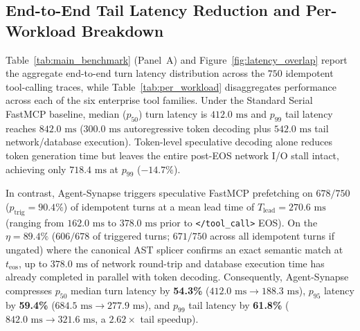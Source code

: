 \documentclass[10pt,conference]{IEEEtran}
\begin{document}
\subsection{End-to-End Tail Latency Reduction and Per-Workload Breakdown}
Table~\ref{tab:main_benchmark} (Panel~A) and Figure~\ref{fig:latency_overlap} report the aggregate end-to-end turn latency distribution across the $750$ idempotent tool-calling traces, while Table~\ref{tab:per_workload} disaggregates performance across each of the six enterprise tool families. Under the Standard Serial FastMCP baseline, median ($p_{50}$) turn latency is $412.0\text{ ms}$ and $p_{99}$ tail latency reaches $842.0\text{ ms}$ ($300.0\text{ ms}$ autoregressive token decoding plus $542.0\text{ ms}$ tail network/database execution). Token-level speculative decoding alone reduces token generation time but leaves the entire post-EOS network I/O stall intact, achieving only $718.4\text{ ms}$ at $p_{99}$ ($-14.7\%$).

In contrast, Agent-Synapse triggers speculative FastMCP prefetching on $678 / 750$ ($p_{\text{trig}} = 90.4\%$) of idempotent turns at a mean lead time of $T_{\text{lead}} = 270.6\text{ ms}$ (ranging from $162.0\text{ ms}$ to $378.0\text{ ms}$ prior to \texttt{</tool\_call>} EOS). On the $\eta = 89.4\%$ ($606/678$ of triggered turns; $671/750$ across all idempotent turns if ungated) where the canonical AST splicer confirms an exact semantic match at $t_{\text{eos}}$, up to $378.0\text{ ms}$ of network round-trip and database execution time has already completed in parallel with token decoding. Consequently, Agent-Synapse compresses $p_{50}$ median turn latency by \textbf{54.3\%} ($412.0\text{ ms} \to 188.3\text{ ms}$), $p_{95}$ latency by \textbf{59.4\%} ($684.5\text{ ms} \to 277.9\text{ ms}$), and $p_{99}$ tail latency by \textbf{61.8\%} ($842.0\text{ ms} \to 321.6\text{ ms}$, a $2.62\times$ tail speedup).
\end{document}
